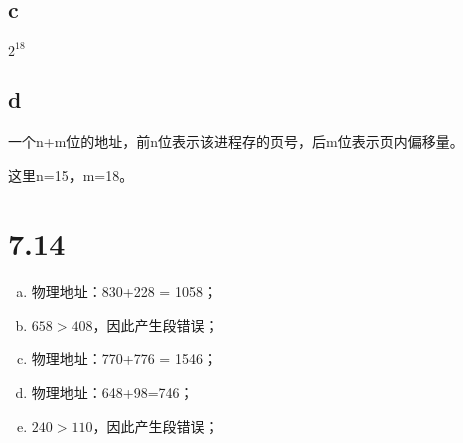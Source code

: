 \documentclass[UTF8]{ctexart}
\begin{document}
    \subsection{c}
    $2^{18}$
    \subsection{d}
    一个n+m位的地址，前n位表示该进程存的页号，后m位表示页内偏移量。\par 
    这里n=15，m=18。
    \section{7.14}
    \begin{enumerate}[a.]
        \item 物理地址：830+228 = 1058；
        \item $658>408$，因此产生段错误；
        \item 物理地址：770+776 = 1546；
        \item 物理地址：648+98=746；
        \item $240>110$，因此产生段错误；
    \end{enumerate}
\end{document}
